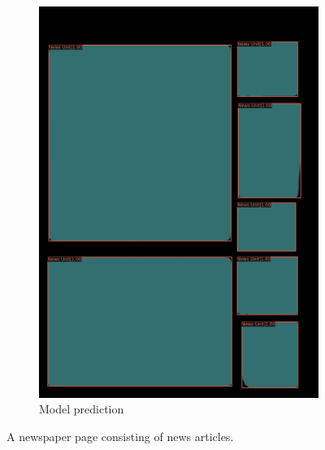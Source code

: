 \documentclass[aspectratio=1610]{beamer}
\begin{document}
\begin{frame}
\begin{figure}
\begin{subfigure}{.25\textwidth}
  \includegraphics[width=0.99\linewidth, clip=true, trim = 0mm 0mm 0mm 0mm]{figures/labels-vanilla-0.75/AVThDFz.jpg}
  \caption{Model prediction}
\end{subfigure}
\caption{A newspaper page consisting of news articles.}
\label{fig:newsarticles}
\end{figure}
\end{frame}
\normalpage
\end{document}

